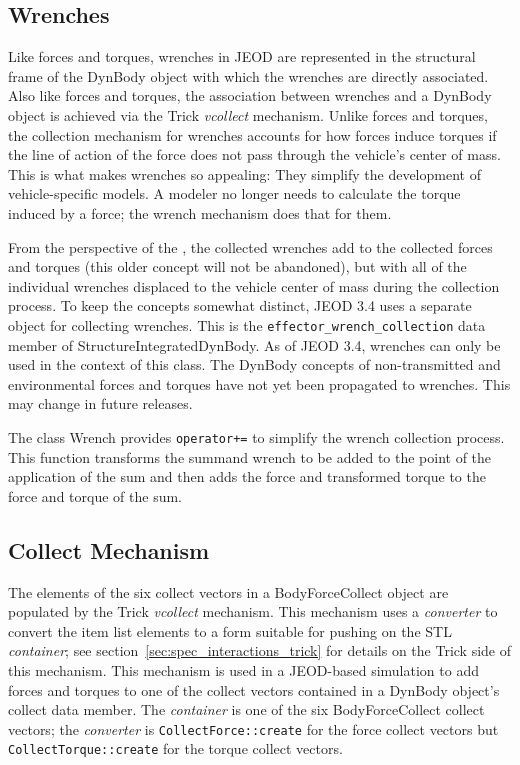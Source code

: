 \subsection{Wrenches}\label{sec:detailed_wrench}
Like forces and torques, wrenches in JEOD are represented in the structural
frame of the DynBody object with which the wrenches are directly associated.
Also like forces and torques, the association between wrenches and a
DynBody object is achieved  via the Trick \emph{vcollect} mechanism.
Unlike forces and torques, the collection mechanism for wrenches accounts for
how forces induce torques if the line of action of the force does not pass
through the vehicle's center of mass. This is what makes wrenches so appealing:
They simplify the development of vehicle-specific models. A modeler no longer
needs to calculate the torque induced by a force; the wrench mechanism does
that for them.

From the perspective of the \ModelDesc, the collected wrenches add to the
collected forces and torques (this older concept will not be abandoned),
but with all of the individual wrenches displaced to the vehicle
center of mass during the collection process. To keep the concepts somewhat
distinct, JEOD 3.4 uses a separate object for collecting wrenches. This is
the \verb+effector_wrench_collection+ data member of StructureIntegratedDynBody.
As of JEOD 3.4, wrenches can only be used in the context of this class.
The DynBody concepts of non-transmitted and environmental forces and torques
have not yet been propagated to wrenches. This may change in future releases.

The class Wrench provides \verb|operator+=| to simplify the wrench collection
process. This function transforms the summand wrench to be added to the point of
the application of the sum and then adds the force and transformed torque
to the force and torque of the sum.

\subsection{Collect Mechanism}\label{sec:detailed_collect}
The elements of the six collect vectors in a BodyForceCollect object are
populated by the Trick \emph{vcollect} mechanism.
This mechanism uses a \emph{converter} to convert the item list elements to a
form suitable for pushing on the STL \emph{container};
see section~\ref{sec:spec_interactions_trick} for details on the Trick side
of this mechanism.
This mechanism is used in a JEOD-based simulation to add forces and torques to
one of the collect vectors contained in a DynBody object's collect data member.
The \emph{container} is one of the six BodyForceCollect collect vectors;
the \emph{converter} is \verb+CollectForce::create+ for the force collect
vectors but \verb+CollectTorque::create+ for the torque collect vectors.

